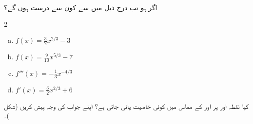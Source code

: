 اگر  ہو تب درج ذیل میں سے کون سے درست ہوں گے؟
\begin{multicols}{2}
\begin{enumerate}[a.]

\item
$f(x)=\tfrac{3}{2}x^{2/3}-3$
\item
$f(x)=\tfrac{9}{10}x^{5/3}-7$
\item
$f'''(x)=-\tfrac{1}{3}x^{-4/3}$
\item
$f'(x)=\tfrac{3}{2}x^{2/3}+6$
\end{enumerate}
\end{multicols}
کیا نقطہ  اور  پر  اور  کے مماس میں کوئی خاصیت پائی جاتی ہے؟ اپنے جواب کی وجہ پیش کریں (شکل )۔
